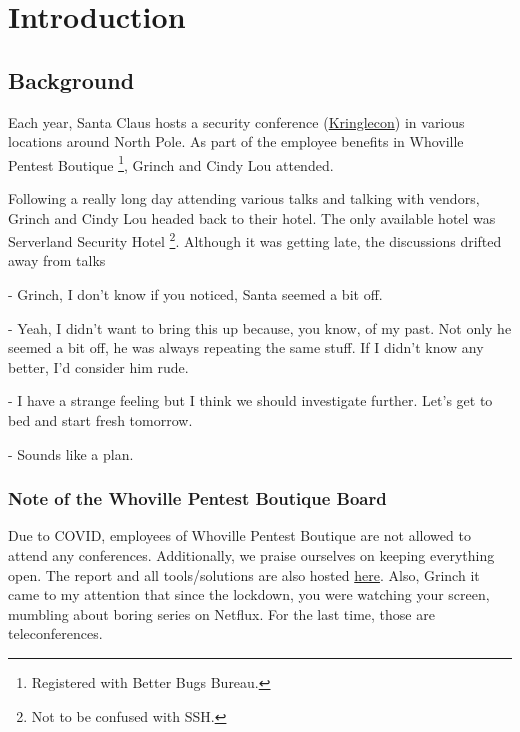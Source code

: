 \chapter{Introduction}

\section{Background}

Each year, Santa Claus hosts a security conference (\href{https://kringlecon.com/}{Kringlecon}) in various locations around North Pole.
As part of the employee benefits in Whoville Pentest Boutique \footnote{Registered with Better Bugs Bureau.},
Grinch and Cindy Lou attended.

Following a really long day attending various talks and talking with vendors,
Grinch and Cindy Lou headed back to their hotel. The only available hotel was
Serverland Security Hotel \footnote{Not to be confused with SSH.}. Although it was getting late,
the discussions drifted away from talks

- Grinch, I don't know if you noticed, Santa seemed a bit off.

- Yeah, I didn't want to bring this up because, you know, of my past.
Not only he seemed a bit off, he was always repeating the same stuff. If I didn't
know any better, I'd consider him rude.

- I have a strange feeling but I think we should investigate further. Let's get to bed and start fresh tomorrow.

- Sounds like a plan.


\subsection{Note of the Whoville Pentest Boutique Board}
Due to COVID, employees of Whoville Pentest Boutique are not allowed to attend any conferences.
Additionally, we praise ourselves on keeping everything open. The report and all tools/solutions are also hosted \href{https://github.com/frite/kringlecon-2020}{here}.
Also, Grinch it came to my attention that since the lockdown, you were watching your screen, mumbling about boring series on Netflux. For the last time, those are teleconferences.
